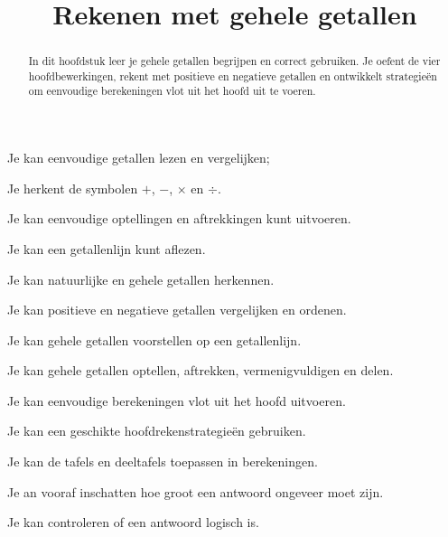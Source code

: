 \documentclass{ximera}
\title{Rekenen met gehele getallen}
\begin{document}


\begin{abstract}
    In dit hoofdstuk leer je gehele getallen begrijpen en correct gebruiken.
    Je oefent de vier hoofdbewerkingen, rekent met positieve en negatieve
    getallen en ontwikkelt strategieën om eenvoudige berekeningen vlot uit
    het hoofd uit te voeren.
    \end{abstract}

\maketitle


\begin{voorkennis}
    \item Je kan eenvoudige getallen lezen en vergelijken;
    \item Je herkent de symbolen \(+\), \(-\), \(\times\) en \(\div\).
    \item Je kan eenvoudige optellingen en aftrekkingen kunt uitvoeren.
    \item Je kan een getallenlijn kunt aflezen.
\end{voorkennis}

\begin{leerdoelen}
    \item Je kan natuurlijke en gehele getallen herkennen.
    \item Je kan positieve en negatieve getallen vergelijken en ordenen.
    \item Je kan gehele getallen voorstellen op een getallenlijn.
    \item Je kan gehele getallen optellen, aftrekken, vermenigvuldigen en delen.
    \item Je kan eenvoudige berekeningen vlot uit het hoofd uitvoeren.
    \item Je kan een geschikte hoofdrekenstrategieën gebruiken.
    \item Je kan de tafels en deeltafels toepassen in berekeningen.
    \item Je an vooraf inschatten hoe groot een antwoord ongeveer moet zijn.
    \item Je kan controleren of een antwoord logisch is.
\end{leerdoelen}
\end{document}
